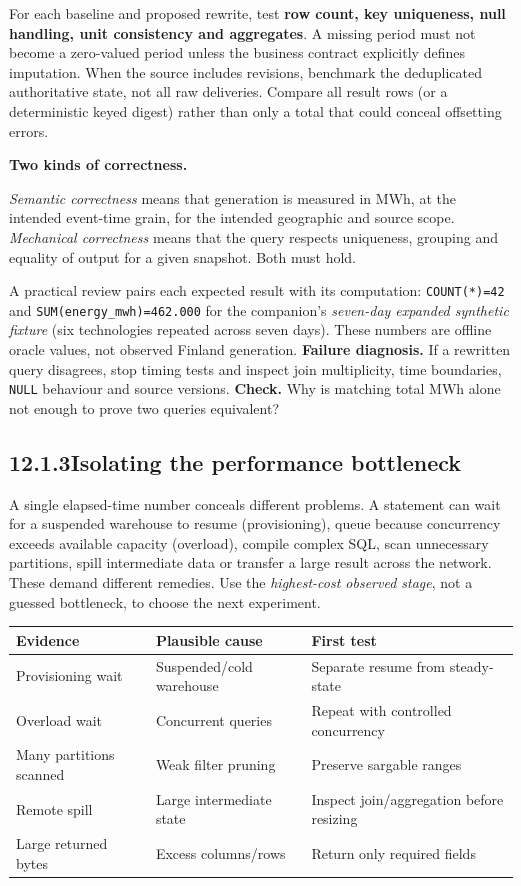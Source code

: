 \documentclass[11pt,twoside]{article}
\newcommand{\topic}[2]{\subsection*{#1\quad #2}}
\begin{document}
For each baseline and proposed rewrite, test \textbf{row count, key uniqueness, null handling, unit consistency and aggregates}. A missing period must not become a zero-valued period unless the business contract explicitly defines imputation. When the source includes revisions, benchmark the deduplicated authoritative state, not all raw deliveries. Compare all result rows (or a deterministic keyed digest) rather than only a total that could conceal offsetting errors.
\begin{insight}\textbf{Two kinds of correctness.}\par
\emph{Semantic correctness} means that generation is measured in MWh, at the intended event-time grain, for the intended geographic and source scope. \emph{Mechanical correctness} means that the query respects uniqueness, grouping and equality of output for a given snapshot. Both must hold.\end{insight}
A practical review pairs each expected result with its computation: \texttt{COUNT(*)=42} and \texttt{SUM(energy\_mwh)=462.000} for the companion's \emph{seven-day expanded synthetic fixture} (six technologies repeated across seven days). These numbers are offline oracle values, not observed Finland generation.
\textbf{Failure diagnosis.} If a rewritten query disagrees, stop timing tests and inspect join multiplicity, time boundaries, \texttt{NULL} behaviour and source versions. \textbf{Check.} Why is matching total MWh alone not enough to prove two queries equivalent?
\newpage
\topic{12.1.3}{Isolating the performance bottleneck}
A single elapsed-time number conceals different problems. A statement can wait for a suspended warehouse to resume (provisioning), queue because concurrency exceeds available capacity (overload), compile complex SQL, scan unnecessary partitions, spill intermediate data or transfer a large result across the network. These demand different remedies. Use the \emph{highest-cost observed stage}, not a guessed bottleneck, to choose the next experiment.
\begin{center}\renewcommand{\arraystretch}{1.1}\begin{tabularx}{\linewidth}{@{}p{33mm}XX@{}}\toprule
\textbf{Evidence}&\textbf{Plausible cause}&\textbf{First test}\\\midrule
Provisioning wait&Suspended/cold warehouse&Separate resume from steady-state\\
Overload wait&Concurrent queries&Repeat with controlled concurrency\\
Many partitions scanned&Weak filter pruning&Preserve sargable ranges\\
Remote spill&Large intermediate state&Inspect join/aggregation before resizing\\
Large returned bytes&Excess columns/rows&Return only required fields\\\bottomrule\end{tabularx}\end{center}
\end{document}
